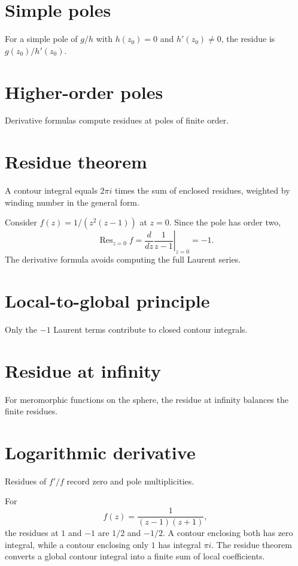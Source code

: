 \section{Simple poles}
For a simple pole of $g/h$ with $h(z_0)=0$ and $h'(z_0)\ne0$, the residue is $g(z_0)/h'(z_0)$.

\section{Higher-order poles}
Derivative formulas compute residues at poles of finite order.

\section{Residue theorem}
A contour integral equals $2\pi i$ times the sum of enclosed residues, weighted by winding number in the general form.

\begin{example}\label{ex:iv10-expand-02}
Consider \(f(z)=1/(z^2(z-1))\) at \(z=0\). Since the pole has order two,
\[
\operatorname{Res}_{z=0}f
=\left.\frac{d}{dz}\frac1{z-1}\right|_{z=0}=-1.
\]
The derivative formula avoids computing the full Laurent series.
\end{example}
\section{Local-to-global principle}
Only the $-1$ Laurent terms contribute to closed contour integrals.

\section{Residue at infinity}
For meromorphic functions on the sphere, the residue at infinity balances the finite residues.

\section{Logarithmic derivative}
Residues of $f'/f$ record zero and pole multiplicities.

\begin{example}\label{ex:iv10-expand-03}
For
\[
f(z)=\frac{1}{(z-1)(z+1)},
\]
the residues at \(1\) and \(-1\) are \(1/2\) and \(-1/2\). A contour enclosing both has zero integral, while a contour enclosing only \(1\) has integral \(\pi i\). The residue theorem converts a global contour integral into a finite sum of local coefficients.
\end{example}
